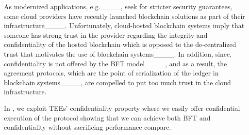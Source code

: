  As modernized applications, e.g.____, seek for stricter security guarantees, some cloud providers have recently launched blockchain solutions as part of their infrastructure____. Unfortunately, cloud-hosted blockchain systems imply that someone has strong trust in the provider regarding the integrity and confidentiality of the hosted blockchain which is opposed to the de-centralized trust that motivates the use of blockchain systems____. In addition, since, confidentiality is not offered by the BFT model____, and as a result, the agreement protocols, which are the point of serialization of the ledger in blockchain systems____, are compelled to put too much trust in the cloud infrastructure. 

In \projecttitle{}, we exploit TEEs' confidentiality property where we easily offer confidential execution of the protocol showing that we can achieve both BFT and confidentiality without sacrificing performance compare.
\fi




%